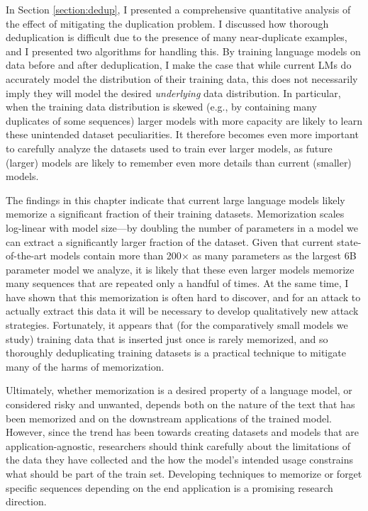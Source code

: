 In Section \ref{section:dedup}, I presented a comprehensive quantitative analysis of the effect of mitigating the duplication problem.
I discussed how thorough deduplication is difficult due to the presence of many near-duplicate examples, and I presented two algorithms for handling this.
By training language models on data before and after deduplication, I make the case that while current LMs do accurately model the distribution of their training data, this does not necessarily imply they will model the desired \emph{underlying} data distribution.
In particular, when the training data distribution is skewed (e.g., by containing many duplicates of some sequences) larger models with more capacity are likely to learn these unintended dataset peculiarities.
%
It therefore becomes even more important to carefully analyze the datasets used to train ever larger models, as future (larger) models are likely to remember even more details than current (smaller) models.


The findings in this chapter indicate that current large language models likely memorize a significant fraction of their training datasets.
%
Memorization scales log-linear with model size---by doubling the number of parameters in a model we can extract a significantly larger fraction of the dataset.
%
Given that current state-of-the-art models contain more than 200$\times$ as many parameters as the largest 6B parameter model we analyze, it is likely that these even larger models memorize many sequences that are repeated only a handful of times.
%
At the same time, I have shown that this memorization is often hard to discover, and for an attack to actually extract this data it will be necessary to develop qualitatively new attack strategies.
%
Fortunately, it appears that (for the comparatively small models we study) training data that is inserted just once is rarely memorized, and so thoroughly deduplicating training datasets is a practical technique to mitigate many of the harms of memorization.

Ultimately, whether memorization is a desired property of a language model, or considered risky and unwanted, depends
both on the nature of the text that has been memorized and on the downstream applications of the trained model.
However, since the trend has been towards creating datasets and models that are application-agnostic, researchers should think carefully about the limitations of the data they have collected and the how the model's intended usage constrains what should be part of the train set. 
Developing techniques to memorize or forget specific sequences depending on the end application is a promising research direction. 


